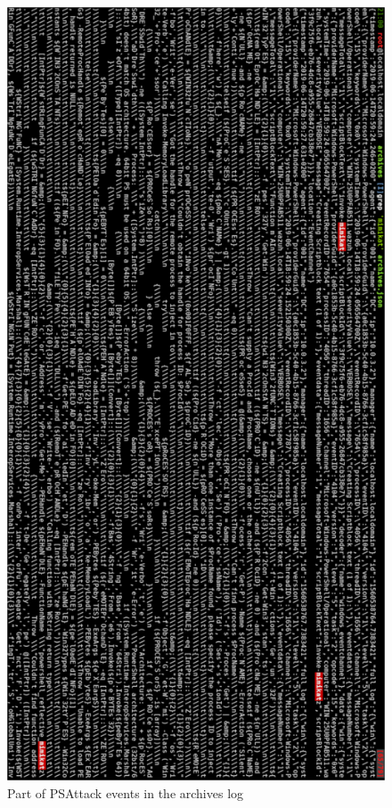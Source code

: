 \begin{figure}[H]
	\centering
	\includegraphics[height=\textheight]{figuras/PSATTACK_mimikatz_rotated.png}
	\caption{Part of PSAttack events in the archives log}
\end{figure}

